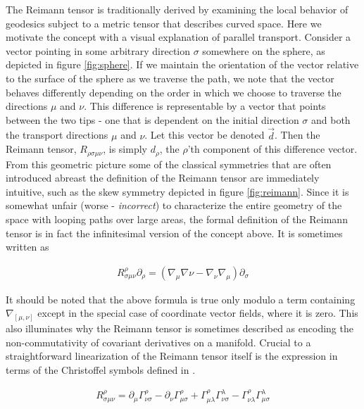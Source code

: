 The Reimann tensor is traditionally derived by examining the local behavior of geodesics subject to a metric tensor that describes curved space. Here we motivate the concept with a visual explanation of parallel transport. Consider a vector pointing in some arbitrary direction $\sigma$ somewhere on the sphere, as depicted in figure \ref{fig:sphere}. If we maintain the orientation of the vector relative to the surface of the sphere as we traverse the path, we note that the vector behaves differently depending on the order in which we choose to traverse the directions $\mu$ and $\nu$. This difference is representable by a vector that points between the two tips - one that is dependent on the initial direction $\sigma$ and both the transport directions $\mu$ and $\nu$. Let this vector be denoted $\vec{d}$. Then the Reimann tensor, $R_{\rho \sigma \mu \nu}$, is simply $d_{\rho}$, the $\rho$'th component of this difference vector. From this geometric picture some of the classical symmetries that are often introduced abreast the definition of the Reimann tensor are immediately intuitive, such as the skew symmetry depicted in figure \ref{fig:reimann}.
Since it is somewhat unfair (worse - \textit{incorrect}) to characterize the entire geometry of the space with looping paths over large areas, the formal definition of the Reimann tensor is in fact the infinitesimal version of the concept above. It is sometimes written as 

\begin{align}
R^{\rho}_{\sigma \mu \nu}\partial_{\rho} = \left(\nabla_{\mu}\nabla{\nu} - \nabla_{\nu}\nabla_{\mu}\right)\partial_{\sigma}
\end{align} 

It should be noted that the above formula is true only modulo a term containing $\nabla_{[\mu, \nu]}$ except in the special case of coordinate vector fields, where it is zero. This also illuminates why the Reimann tensor is sometimes described as encoding the non-commutativity of covariant derivatives on a manifold. Crucial to a straightforward linearization of the Reimann tensor itself is the expression in terms of the Christoffel symbols defined in . 

\begin{align}\label{eq:reimanntnsfull}
R^{\rho}_{\sigma \mu \nu} = \partial_{\mu}\Gamma^{\rho}_{\nu \sigma} - \partial_{\nu}\Gamma^{\rho}_{\mu \sigma} + \Gamma^{\rho}_{\mu \lambda}\Gamma^{\lambda}_{\nu \sigma} - \Gamma^{\rho}_{\nu \lambda}\Gamma^{\lambda}_{\mu \sigma}
\end{align}

